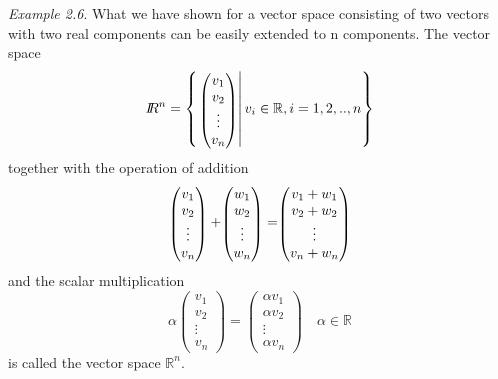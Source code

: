 \documentclass[
  letterpaper,
  DIV=11,
  numbers=noendperiod]{scrartcl}
\theoremstyle{remark}
\begin{document}
\emph{Example 2.6}. What we have shown for a vector space consisting of
two vectors with two real components can be easily extended to n
components. The vector space
\[I\!\!R^{n} = \left\{ \left. \scriptscriptstyle \begin{pmatrix}   v_{1}\\ v_{2} \\ \vdots \\ v_{n}  \end{pmatrix} \textstyle \right| v_{i} \in \mathbb{R}, i=1,2, .. ,n \right\}\]
together with the operation of addition
\[\scriptscriptstyle \begin{pmatrix}   v_{1}\\ v_{2} \\ \vdots \\ v_{n}  \end{pmatrix} \textstyle +  \scriptscriptstyle \begin{pmatrix}   w_{1}\\ w_{2} \\ \vdots \\ w_{n}  \end{pmatrix} \textstyle =  \scriptscriptstyle \begin{pmatrix}   v_{1}+w_{1}\\ v_{2} +w_{2}\\ \vdots \\ v_{n}+w_{n}  \end{pmatrix} \textstyle\]
and the scalar multiplication
\[ \alpha \scriptscriptstyle \begin{pmatrix}   v_{1}\\ v_{2} \\ \vdots \\ v_{n}  \end{pmatrix} \textstyle =  \scriptscriptstyle \begin{pmatrix}    \alpha v_{1}\\  \alpha v_{2} \\ \vdots \\  \alpha v_{n}  \end{pmatrix} \textstyle \quad \alpha \in \mathbb{R}\]
is called the vector space \(\mathbb{R}^{n}\).
\end{document}
